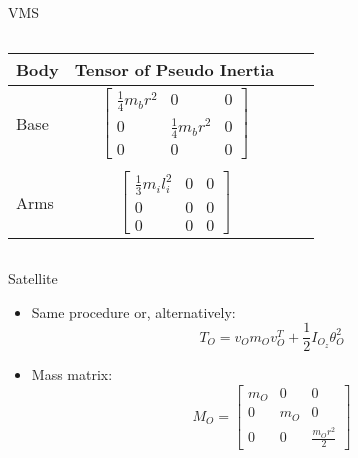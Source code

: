 \begin{frame}{VMS}
\begin{columns}
\begin{column}{0.5\textwidth}
\begin{table}
\begin{center}
                    \begin{tabular}{lccc}
                    \hline
                    \textbf{Body} & \textbf{Tensor of Pseudo Inertia}\\
                    \hline
                    Base&$\begin{bmatrix}
                      \frac{1}{4}m_br^2&0&0\\
                      0&\frac{1}{4}m_br^2&0\\
                      0&0&0
                    \end{bmatrix}$\\
                    \\
                    Arms&$\begin{bmatrix}
                      \frac{1}{3}m_il_i^2&0&0\\
                      0&0&0\\
                      0&0&0
                    \end{bmatrix}$\\
                    \hline
                    \end{tabular}
                    \end{center}
                    \end{table}
            \end{column}
        \end{columns}
        \end{frame}

\begin{frame}{Satellite}
    \begin{itemize}
        \item Same procedure or, alternatively:
        \begin{equation}
            T_O=v_Om_Ov_O^T+\frac{1}{2}I_{O_z}\theta_O^2
          \end{equation}
        \item Mass matrix: 
        \begin{equation}
            M_O=\begin{bmatrix}
                m_O&0&0\\
                0&m_O&0\\
                0&0&\frac{m_Or^2}{2}
              \end{bmatrix}
        \end{equation}
    \end{itemize}
\end{frame}

